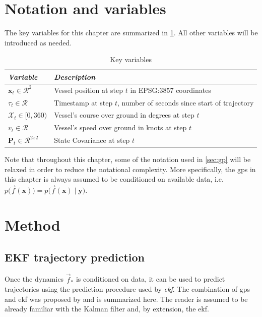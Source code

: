 \section{Notation and variables}
The key variables for this chapter are summarized in \cref{table:dyngp_key_variables}. All other variables will be introduced as needed.
\begin{table}[h]
    \centering
    \begin{tabular}{ll}
        \textit{\textbf{Variable}}               & \textit{\textbf{Description}}                                      \\ \hline
        $\boldsymbol{x}_t \in \mathcal{R}^2$     & Vessel position at step $t$ in EPSG:3857 coordinates               \\
        $\tau_t \in \mathcal{R}$                 & Timestamp at step $t$, number of seconds since start of trajectory \\
        $\mathcal{X}_t \in [0, 360)$             & Vessel's course over ground in degrees at step $t$                 \\
        $v_t \in \mathcal{R}$                    & Vessel's speed over ground in knots at step $t$                    \\
        $\boldsymbol{P}_t \in \mathcal{R}^{2x2}$ & State Covariance at step $t$                                       \\
    \end{tabular}
    \caption{Key variables}
    \label{table:dyngp_key_variables}
\end{table}

Note that throughout this chapter, some of the notation used in \cref{sec:gp} will be relaxed in order to reduce the notational complexity. More specifically, the \acrshort{gp}s in this chapter is always assumed to be conditioned on available data, i.e. $p\big(\vec{f}(\boldsymbol{x})\big) = p\big(\vec{f}(\boldsymbol{x}) \; | \; \boldsymbol{y} \big)$.
\section{Method}
\subsection{EKF trajectory prediction}
Once the dynamics $\vec{f}_*$ is conditioned on data, it can be used to predict trajectories using the prediction procedure used by \textit{\acrfull{ekf}}. The combination of \acrshort{gp}s and \acrshort{ekf} was proposed by \cite{gpekf} and is summarized here. The reader is assumed to be already familiar with the Kalman filter and, by extension, the \acrshort{ekf}.

